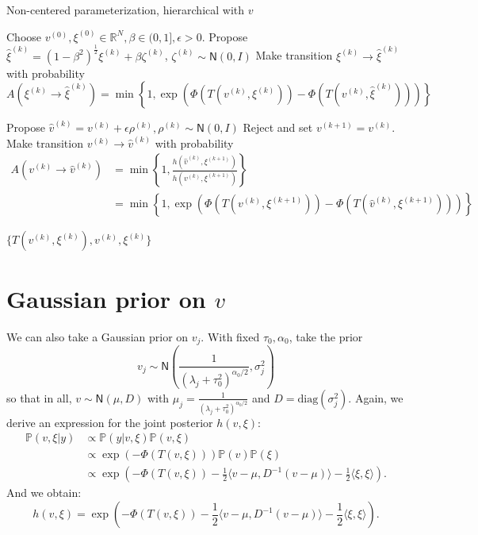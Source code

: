 \documentclass{siamart1116}
\begin{document}
    \begin{algorithm}
    \caption{Non-centered parameterization, hierarchical with $v$}
    \label{alg:hier_v}
    \begin{algorithmic}
    \State Choose $v^{(0)}, \xi^{(0)} \in \mathbb{R}^N, \beta \in (0, 1], \epsilon > 0$.
    \State Propose $\hat\xi^{(k)} = (1-\beta^2)^{\frac{1}{2}}\xi^{(k)} + \beta \zeta^{(k)}$, $\zeta^{(k)} \sim \mathsf{N}(0, I)$
    \State Make transition $\xi^{(k)} \to \hat\xi^{(k)}$ with probability
    \[ A(\xi^{(k)} \to \hat\xi^{(k)}) = \min\left\{1, \exp\left(\Phi(T(v^{(k)}, \xi^{(k)})) - \Phi(T(v^{(k)}, \hat \xi^{(k)}))\right) \right\}\]

    \State Propose $\hat v^{(k)} = v^{(k)} + \epsilon \rho^{(k)}, \rho^{(k)} \sim \mathsf{N}(0,I)$
        \State Reject and set $v^{(k+1)} = v^{(k)}$.
    \Else
    \State Make transition $v^{(k)} \to \hat v^{(k)}$ with probability
    \begin{align*}
     A(v^{(k)} \to \hat v^{(k)}) &= \min\left\{1, \frac{h(\hat v^{(k)}, \xi^{(k+1)})}{h(v^{(k)}, \xi^{(k+1)})}\right\} \\
     &= \min\left\{1, \exp\left(\Phi(T(v^{(k)}, \xi^{(k+1)}))-\Phi(T(\hat v^{(k)}, \xi^{(k+1)})) \right) \right\}
     \end{align*}
    \EndIf

    \EndFor
    \State \Return $\{ T(v^{(k)},\xi^{(k)}), v^{(k)}, \xi^{(k)} \}$
    \end{algorithmic}
    \end{algorithm}

\section{Gaussian prior on $v$}
    We can also take a Gaussian prior on $v_j$. With fixed $\tau_0, \alpha_0$, take the prior 
    \[v_j \sim \mathsf{N}\left(\frac{1}{(\lambda_j + \tau_0^2)^{\alpha_0/2}},\sigma_j^2\right)\]
    so that in all, $v \sim \mathsf{N}{(\mu, D)}$ with $\mu_j = \frac{1}{(\lambda_j + \tau_0^2)^{\alpha_0/2}}$ and $D = \text{diag}(\sigma_j^2)$. Again, we derive an expression for the joint posterior $h(v,\xi)$:
    \begin{align*}
        \mathbb{P}(v,\xi|y) &\propto \mathbb{P}(y|v,\xi) \mathbb{P}(v,\xi)\\
        &\propto \exp \left(-\Phi(T(v,\xi)) \right) \mathbb{P}(v) \mathbb{P}(\xi)\\
        &\propto \exp \left(-\Phi(T(v,\xi)) -\frac{1}{2}\langle v - \mu, D^{-1}(v - \mu) \rangle -\frac{1}{2} \langle \xi, \xi \rangle\right).
    \end{align*}
    And we obtain:
    \begin{equation}
    h(v,\xi) = \exp \left(-\Phi(T(v,\xi)) -\frac{1}{2}\langle v - \mu, D^{-1}(v - \mu) \rangle -\frac{1}{2} \langle \xi, \xi \rangle\right).
    \end{equation}
\end{document}
